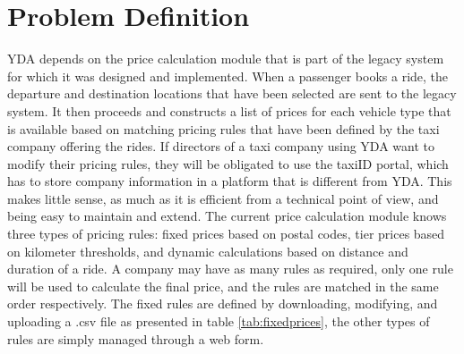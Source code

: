 %
\section{Problem Definition}
YDA depends on the price calculation module that is part of the legacy system for which it was designed and implemented. When a passenger books a ride, the departure and destination locations that have been selected are sent to the legacy system. It then proceeds and constructs a list of prices for each vehicle type that is available based on matching pricing rules that have been defined by the taxi company offering the rides. If directors of a taxi company using YDA want to modify their pricing rules, they will be obligated to use the taxiID portal, which has to store company information in a platform that is different from YDA. This makes little sense, as much as it is efficient from a technical point of view, and being easy to maintain and extend.
%
%
The current price calculation module knows three types of pricing rules: fixed prices based on postal codes, tier prices based on kilometer thresholds, and dynamic calculations based on distance and duration of a ride. A company may have as many rules as required, only one rule will be used to calculate the final price, and the rules are matched in the same order respectively. The fixed rules are defined by downloading, modifying, and uploading a .csv file as presented in table \ref{tab:fixedprices}, the other types of rules are simply managed through a web form.

